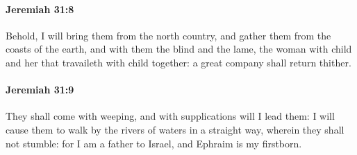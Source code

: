 		\paragraph{Jeremiah 31:8} %
			\label{JEREMIAH-31-8}

			Behold, I will bring them from the north country, and gather them from the coasts of the earth, and with them the blind and the lame, the woman with child and her that travaileth with child together: a great company shall return thither.


		\paragraph{Jeremiah 31:9} %
			\label{JEREMIAH-31-9}

			They shall come with weeping, and with supplications will I lead them: I will cause them to walk by the rivers of waters in a straight way, wherein they shall not stumble: for I am a father to Israel, and Ephraim is my firstborn.


